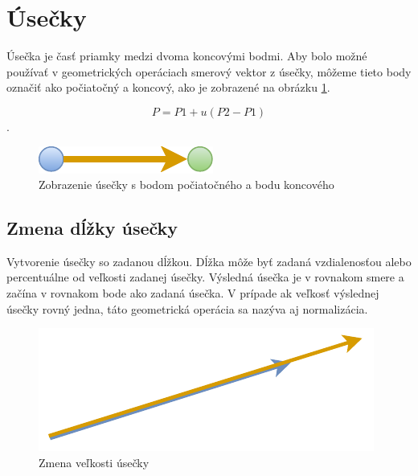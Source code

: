 \section{Úsečky}
Úsečka je časť priamky medzi dvoma koncovými bodmi. Aby bolo možné používať v geometrických operáciach smerový vektor z úsečky, môžeme tieto body označiť ako počiatočný a koncový, ako je zobrazené na obrázku \ref{fig:Navrh operacii-1D - Line}. 

\begin{equation}
    P = P1 + u(P2-P1)
    \label{eq:priamka}
\end{equation}. 

\begin{figure}[H]
	\centering
	\includegraphics[]{obrazky-figures/Diagram/Draw/2Line/DP Navrh operacii-1D - Line.pdf}
	\caption{Zobrazenie úsečky s bodom počiatočného a bodu koncového}
	\label{fig:Navrh operacii-1D - Line}
\end{figure}


\subsection*{Zmena dĺžky úsečky}
Vytvorenie úsečky so zadanou dĺžkou. Dĺžka môže byť zadaná vzdialenosťou alebo percentuálne od veľkosti zadanej úsečky. Výsledná úsečka je v rovnakom smere a začína v rovnakom bode ako zadaná úsečka. V prípade ak veľkosť výslednej úsečky rovný jedna, táto geometrická operácia sa nazýva aj normalizácia.  


\begin{figure}[H]
	\centering
	\includegraphics[]{obrazky-figures/Diagram/Draw/2Line/DP Navrh operacii-1D - LineChangeLength.pdf}
	\caption{Zmena veľkosti úsečky}
	\label{fig:LineChangeLength}
\end{figure}

